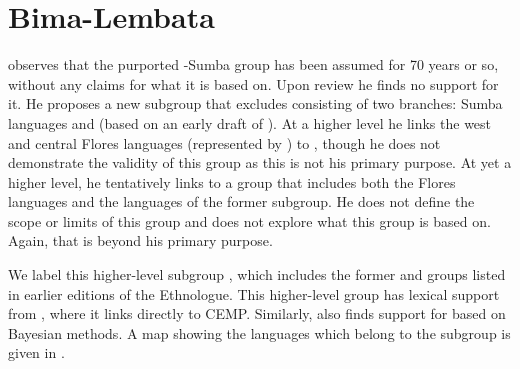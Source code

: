 \chapter{Bima-Lembata}\label{ch:BL}
\citet{Blust2008} observes that the purported -Sumba group
has been assumed for 70 years or so,
without any claims for what it is based on.
Upon review he finds no support for it.
He proposes a new  subgroup that excludes 
consisting of two branches: Sumba languages
and  (based on an early draft of \citealt{Grimes2010a}).
At a higher level he links the west
and central Flores languages (represented by )
to , though he does not demonstrate the validity of this group as
this is not his primary purpose.
At yet a higher level,
he tentatively links  to a group that includes both the Flores
languages and the languages of the former  subgroup.
He does not define the scope or limits of this group
and does not explore what this group is based on.
Again, that is beyond his primary purpose.

We label this higher-level subgroup ,
which includes the former 
and  groups listed in earlier editions of the Ethnologue.
This higher-level group has lexical support from \cite{GrayGreenhill2009},
where it links directly to CEMP.
Similarly, \citet{Gasser2014b} also finds support for 
based on Bayesian methods.
A map showing the languages which belong to
the  subgroup is given in .

